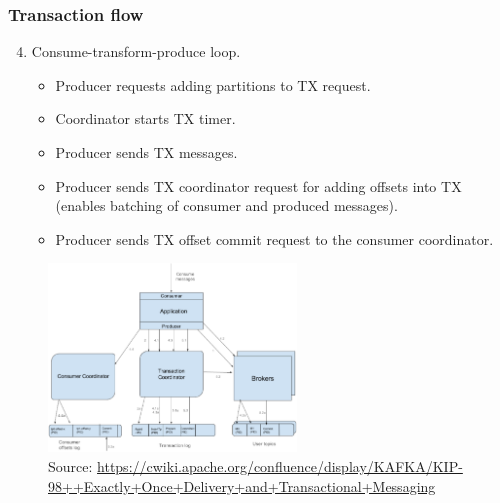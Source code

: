 \documentclass[10pt,utf8]{beamer}
\begin{document}
\begin{frame}
    \frametitle{Transaction flow}
    \begin{enumerate}
        \setcounter{enumi}{3}
        \item Consume-transform-produce loop.
          \begin{itemize}
            \item Producer requests adding partitions to TX request.
            \item Coordinator starts TX timer.
            \item Producer sends TX messages.
            \item Producer sends TX coordinator request for adding offsets into TX (enables batching of consumer and produced messages).
            \item Producer sends TX offset commit request to the consumer coordinator.
          \end{itemize}
    \end{enumerate}
    \begin{figure}
        \centering
        \includegraphics[height=5cm]{./img/tx_flow.eps}
        \caption{\tiny{Source: \url{https://cwiki.apache.org/confluence/display/KAFKA/KIP-98++Exactly+Once+Delivery+and+Transactional+Messaging}}}
    \end{figure}
\end{frame}
\end{document}
